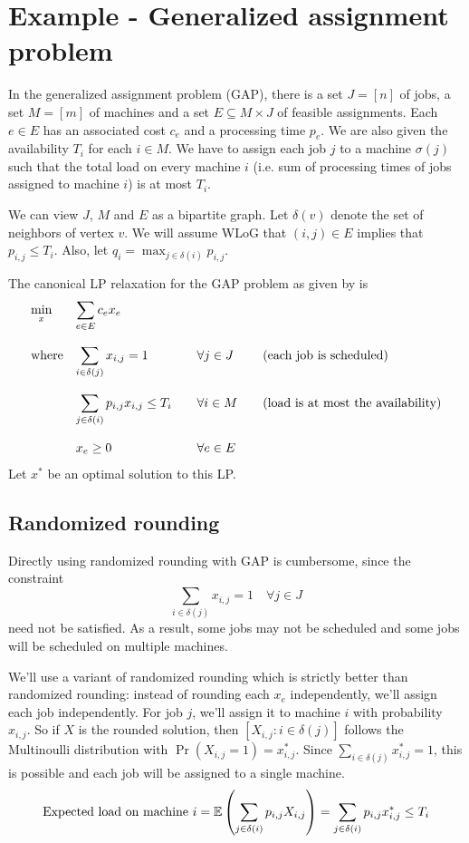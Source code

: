 \section{Example - Generalized assignment problem}

In the generalized assignment problem (GAP), there is a set $J = [n]$ of jobs, a set
$M = [m]$ of machines and a set $E \subseteq M \times J$ of feasible assignments.
Each $e \in E$ has an associated cost $c_e$ and a processing time $p_e$.
We are also given the availability $T_i$ for each $i \in M$.
We have to assign each job $j$ to a machine $\sigma(j)$ such that
the total load on every machine $i$ (i.e. sum of processing times of jobs assigned to machine $i$)
is at most $T_i$.

We can view $J$, $M$ and $E$ as a bipartite graph.
Let $\delta(v)$ denote the set of neighbors of vertex $v$.
We will assume WLoG that $(i, j) \in E$ implies that $p_{i,j} \le T_i$.
Also, let $q_i = \max_{j \in \delta(i)} p_{i,j}$.

The canonical LP relaxation for the GAP problem as given by \cite{lrs-book} is
\[ \begin{array}{*4{>{\displaystyle}l}}
\min_x & \sum_{e \in E}{c_e}{x_e} & &
\\ \\ \textrm{where} & \sum_{i \in \delta(j)} x_{i,j} = 1 & \quad \forall j \in J
& \quad \textrm{(each job is scheduled)}
\\ \\ & \sum_{j \in \delta(i)} p_{i,j} x_{i,j} \le T_i & \quad \forall i \in M
& \quad \textrm{(load is at most the availability)}
\\ \\ & x_e \ge 0 & \quad \forall e \in E
\end{array} \]
Let $x^*$ be an optimal solution to this LP.

\subsection{Randomized rounding}

Directly using randomized rounding with GAP is cumbersome, since the constraint
\[ \sum_{i \in \delta(j)} x_{i,j} = 1 \quad \forall j \in J \]
need not be satisfied. As a result, some jobs may not be scheduled
and some jobs will be scheduled on multiple machines.

We'll use a variant of randomized rounding which is strictly better than randomized rounding:
instead of rounding each $x_e$ independently, we'll assign each job independently.
For job $j$, we'll assign it to machine $i$ with probability $x_{i,j}$.
So if $X$ is the rounded solution, then $[X_{i,j}: i \in \delta(j)]$
follows the Multinoulli distribution with $\Pr(X_{i,j} = 1) = x_{i,j}^*$.
Since $\sum_{i \in \delta(j)} x_{i,j}^* = 1$, this is possible and each job
will be assigned to a single machine.
\[ \textrm{Expected load on machine } i
= \operatorname{\mathbb{E}}\left(\sum_{j \in \delta(i)} p_{i,j}X_{i,j}\right)
= \sum_{j \in \delta(i)} p_{i,j}x_{i,j}^*
\le T_i \]

